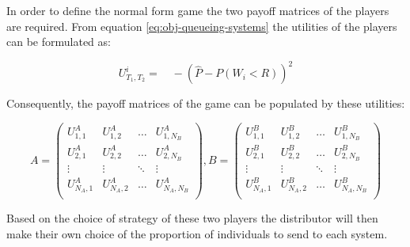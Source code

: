 In order to define the normal form game the two payoff matrices of the players 
are required. From equation \ref{eq:obj-queueing-systems} the utilities of the
players can be formulated as:

\begin{equation}
    U_{T_1, T_2}^i = \quad -\left( 
        \hat{P} - P(W_i < R) 
    \right)^2
\end{equation}

Consequently, the payoff matrices of the game can be populated by these 
utilities:

\begin{equation} \label{eq:payoff-matrices}
    A = 
    \begin{pmatrix}
        U_{1,1}^A & U_{1,2}^A & \dots & U_{1,N_B}^A \\
        U_{2,1}^A & U_{2,2}^A & \dots & U_{2,N_B}^A \\
        \vdots & \vdots & \ddots & \vdots \\
        U_{N_A,1}^A & U_{N_A,2}^A & \dots & U_{N_A,N_B}^A \\
    \end{pmatrix},
    B = 
    \begin{pmatrix}
        U_{1,1}^B & U_{1,2}^B & \dots & U_{1,N_B}^B \\
        U_{2,1}^B & U_{2,2}^B & \dots & U_{2,N_B}^B \\
        \vdots & \vdots & \ddots & \vdots \\
        U_{N_A,1}^B & U_{N_A,2}^B & \dots & U_{N_A,N_B}^B \\
    \end{pmatrix}
\end{equation}

Based on the choice of strategy of these two players the distributor will then 
make their own choice of the proportion of individuals to send to each system.
